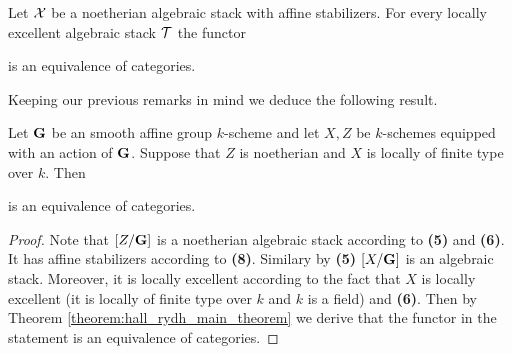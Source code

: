 \begin{theorem}\label{theorem:hall_rydh_main_theorem}
Let ${\mathcal X}$ be a noetherian algebraic stack with affine stabilizers. For every locally excellent algebraic stack ${\mathcal T}$ the functor
\begin{center}
\end{center}
is an equivalence of categories.
\end{theorem}
\noindent
Keeping our previous remarks in mind we deduce the following result.

\begin{corollary}\label{corollary:tannakian_formalism_after_Rydh}
Let $\mathbf{G}$ be an smooth affine group $k$-scheme and let $X,Z$ be $k$-schemes equipped with an action of $\mathbf{G}$. Suppose that $Z$ is noetherian and $X$ is locally of finite type over $k$. Then
\begin{center}
\end{center}
is an equivalence of categories.
\end{corollary}
\begin{proof}
Note that $[Z/\mathbf{G}]$ is a noetherian algebraic stack according to \textbf{(5)} and \textbf{(6)}. It has affine stabilizers according to \textbf{(8)}. Similary by \textbf{(5)} $[X/\mathbf{G}]$ is an algebraic stack. Moreover, it is locally excellent according to the fact that $X$ is locally excellent (it is locally of finite type over $k$ and $k$ is a field) and \textbf{(6)}. Then by Theorem \ref{theorem:hall_rydh_main_theorem} we derive that the functor in the statement is an equivalence of categories. 
\end{proof}


